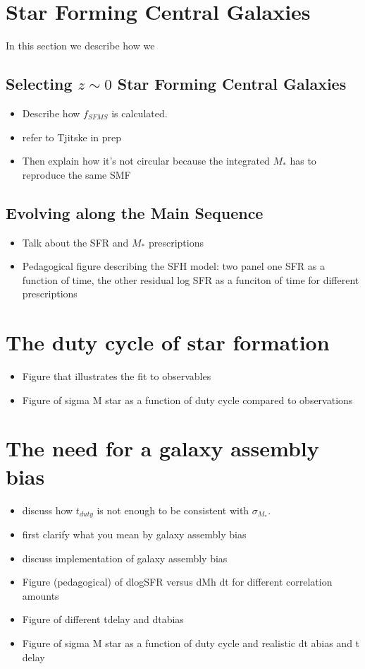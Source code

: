\documentclass[12pt, letterpaper, preprint]{aastex}
\newcommand{\bitem}{\begin{itemize}}
\newcommand{\eitem}{\end{itemize}}
\begin{document}
\section{}  

\section{Star Forming Central Galaxies}  
In this section we describe how we 
\subsection{Selecting $z \sim 0$ Star Forming Central Galaxies}  
\begin{itemize}
    \item Describe how $f_{SFMS}$ is calculated. 
    \item refer to Tjitske in prep 
    \item Then explain how it's not circular because the integrated $M_*$ has to reproduce the same SMF
\end{itemize}

\subsection{Evolving along the Main Sequence} 
\begin{itemize}
    \item Talk about the SFR and $M_*$ prescriptions 
    \item Pedagogical figure describing the SFH model: two panel one SFR as a function of time, the other residual log SFR as a funciton of time for different prescriptions
\end{itemize}

\section{The duty cycle of star formation}
\bitem
\item Figure that illustrates the fit to observables 
\item Figure of sigma M star as a function of duty cycle compared to observations 
\eitem 

\section{The need for a galaxy assembly bias}
\bitem
\item discuss how $t_{duty}$ is not enough to be consistent with $\sigma_{M_*}$. 
\item first clarify what you mean by galaxy assembly bias 
\item discuss implementation of galaxy assembly bias
\item Figure (pedagogical) of dlogSFR versus dMh dt for different correlation amounts 
\item Figure of different tdelay and dtabias 
\item Figure of sigma M star as a function of duty cycle and realistic dt abias and t delay 
\eitem
\end{document}
